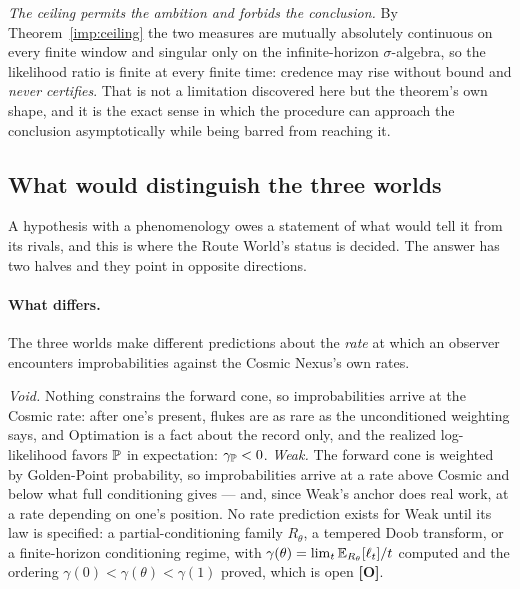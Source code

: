 \emph{The ceiling permits the ambition and forbids the conclusion.} By
Theorem~\ref{imp:ceiling} the two measures are mutually absolutely
continuous on every finite window and singular only on the
infinite-horizon $\sigma$-algebra, so the likelihood ratio is finite at
every finite time: credence may rise without bound and \emph{never
certifies}. That is not a limitation discovered here but the theorem's
own shape, and it is the exact sense in which the procedure can approach
the conclusion asymptotically while being barred from reaching it.


\subsection{What would distinguish the three worlds}
\label{gc:sub:discriminate}

A hypothesis with a phenomenology owes a statement of what would tell it
from its rivals, and this is where the Route World's status is decided.
The answer has two halves and they point in opposite directions.

\paragraph{What differs.} The three worlds make different predictions
about the \emph{rate} at which an observer encounters improbabilities
against the Cosmic Nexus's own rates.

\emph{Void.} Nothing constrains the forward cone, so improbabilities
arrive at the Cosmic rate: after one's present, flukes are as rare as the
unconditioned weighting says, and Optimation is a fact about the record
only, and the realized log-likelihood favors $\mathbb{P}$ in expectation:
$\gamma_{\mathbb{P}}<0$. \emph{Weak.} The forward cone is weighted by Golden-Point probability, so
improbabilities arrive at a rate above Cosmic and below what full
conditioning gives --- and, since Weak's anchor does real work, at a rate
depending on one's position. No rate prediction exists for Weak until
its law is specified: a partial-conditioning family $R_\theta$, a
tempered Doob transform, or a finite-horizon conditioning regime, with
$\gamma(\theta)=\lim_t\mathbb{E}_{R_\theta}[\ell_t]/t$ computed and the
ordering $\gamma(0)<\gamma(\theta)<\gamma(1)$ proved, which is open
\textbf{[O]}.

